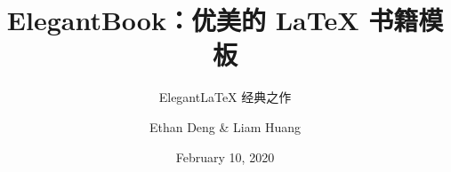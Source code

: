 \documentclass[cn,11pt,chinese]{elegantbook}
\title{ElegantBook：优美的 \LaTeX{} 书籍模板}
\subtitle{Elegant\LaTeX{} 经典之作}
\author{Ethan Deng \& Liam Huang}
\institute{Elegant\LaTeX{} Program}
\date{February 10, 2020}
\begin{document}
\maketitle
\frontmatter



\tableofcontents

\mainmatter







%

\nocite{*} 

\appendix


\end{document}
